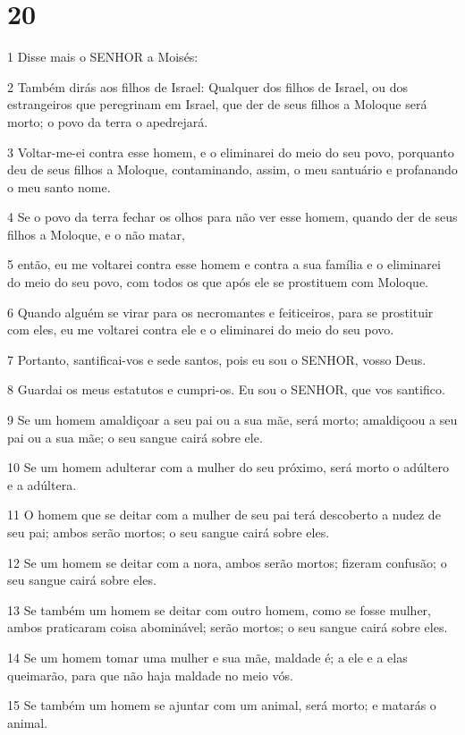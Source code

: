 \chapter{20}

\par 1 Disse mais o SENHOR a Moisés:
\par 2 Também dirás aos filhos de Israel: Qualquer dos filhos de Israel, ou dos estrangeiros que peregrinam em Israel, que der de seus filhos a Moloque será morto; o povo da terra o apedrejará.
\par 3 Voltar-me-ei contra esse homem, e o eliminarei do meio do seu povo, porquanto deu de seus filhos a Moloque, contaminando, assim, o meu santuário e profanando o meu santo nome.
\par 4 Se o povo da terra fechar os olhos para não ver esse homem, quando der de seus filhos a Moloque, e o não matar,
\par 5 então, eu me voltarei contra esse homem e contra a sua família e o eliminarei do meio do seu povo, com todos os que após ele se prostituem com Moloque.
\par 6 Quando alguém se virar para os necromantes e feiticeiros, para se prostituir com eles, eu me voltarei contra ele e o eliminarei do meio do seu povo.
\par 7 Portanto, santificai-vos e sede santos, pois eu sou o SENHOR, vosso Deus.
\par 8 Guardai os meus estatutos e cumpri-os. Eu sou o SENHOR, que vos santifico.
\par 9 Se um homem amaldiçoar a seu pai ou a sua mãe, será morto; amaldiçoou a seu pai ou a sua mãe; o seu sangue cairá sobre ele.
\par 10 Se um homem adulterar com a mulher do seu próximo, será morto o adúltero e a adúltera.
\par 11 O homem que se deitar com a mulher de seu pai terá descoberto a nudez de seu pai; ambos serão mortos; o seu sangue cairá sobre eles.
\par 12 Se um homem se deitar com a nora, ambos serão mortos; fizeram confusão; o seu sangue cairá sobre eles.
\par 13 Se também um homem se deitar com outro homem, como se fosse mulher, ambos praticaram coisa abominável; serão mortos; o seu sangue cairá sobre eles.
\par 14 Se um homem tomar uma mulher e sua mãe, maldade é; a ele e a elas queimarão, para que não haja maldade no meio vós.
\par 15 Se também um homem se ajuntar com um animal, será morto; e matarás o animal.
